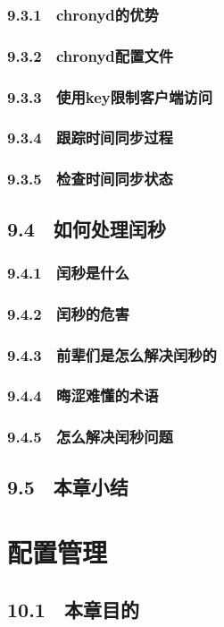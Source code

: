 \documentclass[12pt,UTF8]{ctexbook}
\begin{document}
{\subsection{9.3.1　chronyd的优势}
\subsection{9.3.2　chronyd配置文件}
\subsection{9.3.3　使用key限制客户端访问}
\subsection{9.3.4　跟踪时间同步过程}
\subsection{9.3.5　检查时间同步状态}
\section{9.4　如何处理闰秒}
\subsection{9.4.1　闰秒是什么}
\subsection{9.4.2　闰秒的危害}
\subsection{9.4.3　前辈们是怎么解决闰秒的}
\subsection{9.4.4　晦涩难懂的术语}
\subsection{9.4.5　怎么解决闰秒问题}
\section{9.5　本章小结}
\chapter{配置管理}
\section{10.1　本章目的}
}
\end{document}
